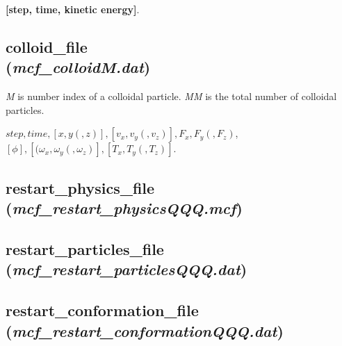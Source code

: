 \documentclass[a4paper,10pt]{article}
\begin{document}
\textbf{[step, time, kinetic energy]}.

\subsection{\textbf{colloid\_file}\\
(\textit{mcf\_colloidM.dat})}
\textit{M} is number index of a colloidal particle.
\textit{MM} is the total number of colloidal particles.

\textbf{$step, time, [x, y(, z)], [v_x, v_y(, v_z)],
F_x, F_y(, F_z)$},
\textbf{$[\phi],[(\omega_x, \omega_y(, \omega_z)], 
[T_x, T_y(, T_z)]$}.

\subsection{\textbf{restart\_physics\_file}\\
(\textit{mcf\_restart\_physicsQQQ.mcf})}


\subsection{\textbf{restart\_particles\_file}\\
(\textit{mcf\_restart\_particlesQQQ.dat})}


\subsection{\textbf{restart\_conformation\_file}\\
(\textit{mcf\_restart\_conformationQQQ.dat})}



\end{document}
